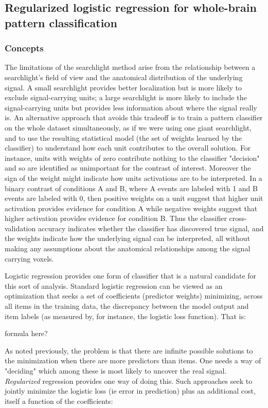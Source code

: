 
\subsection{Regularized logistic regression for whole-brain pattern classification}
\subsubsection{Concepts}
The limitations of the searchlight method arise from the relationship between a searchlight's field of view and the anatomical distribution of the underlying signal. A small searchlight provides better localization but is more likely to exclude signal-carrying units; a large searchlight is more likely to include the signal-carrying units but provides less information about where the signal really is. An alternative approach that avoids this tradeoff is to train a pattern classifier on the whole dataset simultaneously, as if we were using one giant searchlight, and to use the resulting statistical model (the set of weights learned by the classifier) to understand how each unit contributes to the overall solution. For instance, units with weights of zero contribute nothing to the classifier "decision" and so are identified as unimportant for the contrast of interest. Moreover the sign of the weight might indicate how units activations are to be interpreted. In a binary contrast of conditions A and B, where A events are labeled with 1 and B events are labeled with 0, then positive weights on a unit suggest that higher unit activation provides evidence for condition A while negative weights suggest that higher activation provides evidence for condition B. Thus the classifier cross-validation accuracy indicates whether the classifier has discovered true signal, and the weights indicate how the underlying signal can be interpreted, all without making any assumptions about the anatomical relationships among the signal carrying voxels.

Logistic regression provides one form of classifier that is a natural candidate for this sort of analysis. Standard logistic regression can be viewed as an optimization that seeks a set of coefficients (predictor weights) minimizing, across all items in the training data, the discrepancy between the model output and item labels (as measured by, for instance, the logistic loss function). That is:

{\orange formula here?}

As noted previously, the problem is that there are infinite possible solutions to the minimization when there are more predictors than items. One needs a way of "deciding" which among these is most likely to uncover the real signal. {\em Regularized} regression provides one way of doing this. Such approaches seek to jointly minimize the logistic loss (ie error in prediction) plus an additional cost, itself a function of the coefficients:

